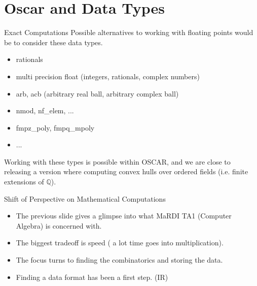 \documentclass[9pt]{beamer}
\theoremstyle{definition}
\begin{document}
\section{Oscar and Data Types}

\begin{frame}[fragile]{Exact Computations}
  Possible alternatives to working with floating points would be to consider these
  data types.
  
  \begin{itemize}
  \item rationals
  \item multi precision float (integers, rationals, complex numbers)
  \item arb, acb (arbitrary real ball, arbitrary complex ball)
  \item nmod, nf\_elem, ...
  \item fmpz\_poly, fmpq\_mpoly
  \item ...
  \end{itemize}

  Working with these types is possible within OSCAR, and we are close to releasing
  a version where computing convex hulls over ordered fields (i.e. finite extensions of $\mathbb{Q}$). 
\end{frame}


\begin{frame}[fragile]{Shift of Perspective on Mathematical Computations}
  \begin{itemize}
    \item The previous slide gives a glimpse into what MaRDI TA1 (Computer Algebra) is concerned with.
    \item The biggest tradeoff is speed ( a lot time goes into multiplication).
    \item The focus turns to finding the combinatorics and storing the data.
    \item Finding a data format has been a first step. (IR)
  \end{itemize}
\end{frame}

\end{document}
